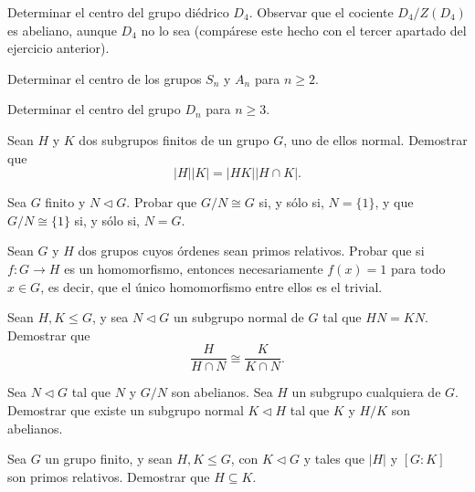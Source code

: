 \begin{ejercicio}
    Determinar el centro del grupo diédrico $D_4$. Observar que el cociente $D_4/Z(D_4)$ es abeliano, aunque $D_4$ no lo sea (compárese este hecho con el tercer apartado del ejercicio anterior).
\end{ejercicio}

\begin{ejercicio}
    Determinar el centro de los grupos $S_n$ y $A_n$ para $n\geq 2$.
\end{ejercicio}

\begin{ejercicio}
    Determinar el centro del grupo $D_n$ para $n\geq 3$.
\end{ejercicio}

\begin{ejercicio}
    Sean $H$ y $K$ dos subgrupos finitos de un grupo $G$, uno de ellos normal. Demostrar que
    \[
        |H||K| = |HK||H\cap K|.
    \]
\end{ejercicio}

\begin{ejercicio}
    Sea $G$ finito y $N\lhd G$. Probar que $G/N\cong G$ si, y sólo si, $N=\{1\}$, y que $G/N\cong \{1\}$ si, y sólo si, $N=G$.
\end{ejercicio}

\begin{ejercicio}
    Sean $G$ y $H$ dos grupos cuyos órdenes sean primos relativos. Probar que si $f:G\to H$ es un homomorfismo, entonces necesariamente $f(x)=1$ para todo $x\in G$, es decir, que el único homomorfismo entre ellos es el trivial.
\end{ejercicio}

\begin{ejercicio}
    Sean $H,K\leq G$, y sea $N\lhd G$ un subgrupo normal de $G$ tal que $HN=KN$. Demostrar que
    \[
        \frac{H}{H\cap N}\cong \frac{K}{K\cap N}.
    \]
\end{ejercicio}

\begin{ejercicio}
    Sea $N\lhd G$ tal que $N$ y $G/N$ son abelianos. Sea $H$ un subgrupo cualquiera de $G$. Demostrar que existe un subgrupo normal $K\lhd H$ tal que $K$ y $H/K$ son abelianos.
\end{ejercicio}

\begin{ejercicio}
    Sea $G$ un grupo finito, y sean $H,K\leq G$, con $K\lhd G$ y tales que $|H|$ y $[G:K]$ son primos relativos. Demostrar que $H\subseteq K$.
\end{ejercicio}


